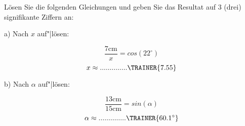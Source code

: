 

\begin{frage}[2]
	Lösen Sie die folgenden Gleichungen und geben Sie das Resultat auf 3
  (drei) signifikante Ziffern an:

  a) Nach $x$ auf"|lösen:

  $$\frac{7\textrm{cm}}{x} = cos(22^\circ)$$
  \vspace{7mm}
  $$ x \approx ..............\TRAINER{7.55}$$

    b) Nach $\alpha$ auf"|lösen:

    $$\frac{13\textrm{cm}}{15\textrm{cm}} = sin(\alpha)$$
    \vspace{7mm}
  $$ \alpha \approx ..............\TRAINER{60.1^\circ}$$

  
\end{frage}
